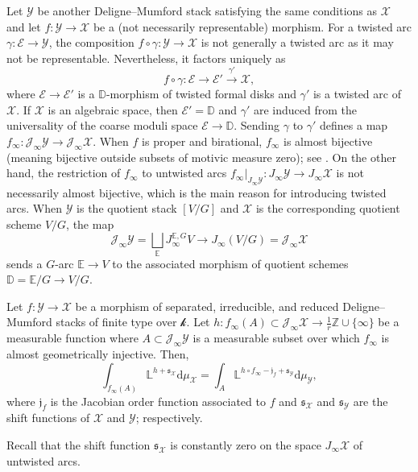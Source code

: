 \documentclass[12pt]{amsart}
\theoremstyle{plain}   %
\theoremstyle{definition}    %
\theoremstyle{remark}    %
\numberwithin{equation}{theorem}
\newcommand{\kay}{\mathcal{k}}
\newcommand{\sE}{\mathcal{E}}
\newcommand{\sJ}{\mathcal{J}}
\newcommand{\sX}{\mathcal{X}}
\newcommand{\sY}{\mathcal{Y}}
\newcommand{\bD}{\mathbb{D}}
\newcommand{\bE}{\mathbb{E}}
\newcommand{\bL}{\mathbb{L}}
\newcommand{\bZ}{\mathbb{Z}}
\begin{document}
Let $\sY$ be another Deligne--Mumford stack satisfying the same conditions as $\sX$ and let $f\colon \sY \to \sX$ be a (not necessarily representable) morphism. For a twisted arc $\gamma\colon\sE \to \sY$, the composition $f\circ \gamma \colon \sY \to \sX$ is not generally a twisted arc as it may not be representable. Nevertheless, it factors uniquely as 
\[
 f\circ \gamma \colon \sE \to \sE' \xrightarrow{\gamma'} \sX,
\]
where $\sE \to \sE'$ is a $\bD$-morphism of twisted formal disks and $\gamma'$ is a twisted arc of $\sX$. 
If $\sX$ is an algebraic space, then $\sE'=\bD$ and $\gamma'$ are induced from the universality of the coarse moduli space $\sE\to \bD$. 
Sending $\gamma $ to $ \gamma'$ defines a map $f_\infty \colon \sJ_\infty \sY \to \sJ _\infty \sX$. When $f$ is proper and birational, $f_{\infty}$ is almost bijective (meaning bijective outside subsets of motivic measure zero); see \cite[Example 13.7]{YasudaMotivicIntegrationDeligneMumfordStack}. On the other hand, the restriction of $f_\infty$ to untwisted arcs $f_\infty |_{J_\infty \sY}\colon J_\infty \sY \to J_\infty \sX$ is not necessarily almost bijective, which is the main reason for introducing twisted arcs. When $\sY$ is the quotient stack $[V/G]$ and $\sX$ is the corresponding quotient scheme $V/G$, the map
\[
\sJ_\infty \sY = \bigsqcup_\bE J_\infty ^{\bE,G}V \to J_\infty (V/G)= \sJ_\infty \sX
\]
sends a $G$-arc $\bE\to V$ to the associated morphism of quotient schemes $\bD=\bE/G \to V/G$.


\begin{theorem}
Let $f\colon \sY \to \sX$ be a morphism of separated, irreducible, and reduced Deligne--Mumford stacks of finite type over $\kay$.
Let $h\colon f_{\infty}(A) \subset \sJ_\infty \sX \to \frac{1}{r}\bZ\cup\{\infty\}$ be a measurable function where $A \subset \sJ_{\infty}\sY$ is a measurable subset over which $f_{\infty}$ is almost geometrically injective. Then,
\[
\int _{f_\infty(A)} \bL^{h+\mathfrak{s}_\sX} \mathrm{d}\mu_\sX =
\int _{A} \bL^{h\circ f_\infty -\mathfrak{j}_f+\mathfrak{s}_\sY} \mathrm{d}\mu_\sY,
\]
where $\mathfrak{j}_f$ is the Jacobian order function associated to $f$ and $\mathfrak{s}_\sX$ and $\mathfrak{s}_\sY$ are the shift functions of $\sX$ and $\sY$; respectively.
\end{theorem}

Recall that the shift function $\mathfrak{s}_\sX$ is constantly zero on the space $J_\infty \sX$ of untwisted arcs. 
\end{document}
